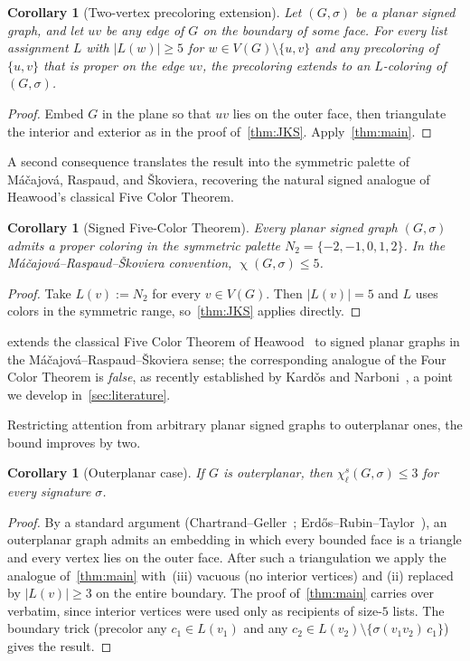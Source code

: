 \documentclass[11pt,a4paper]{article}
\theoremstyle{plain}
\newtheorem{corollary}[theorem]{Corollary}
\theoremstyle{definition}
\newcommand{\V}{V}
\DeclareMathOperator{\chia}{\chi}
\newcommand{\chs}{\chi_{\ell}^{s}}
\newcommand{\Gs}{(G,\sigma)}
\newcommand{\Ns}[1]{N_{#1}}
\begin{document}
\begin{corollary}[Two-vertex precoloring extension]\label{cor:2vert}
Let $\Gs$ be a planar signed graph, and let $uv$ be any edge of $G$
on the boundary of some face. For every list assignment $L$ with
$|L(w)|\ge 5$ for $w\in\V(G)\setminus\{u,v\}$ and any precoloring
of $\{u,v\}$ that is proper on the edge $uv$, the precoloring
extends to an $L$-coloring of $\Gs$.
\end{corollary}

\begin{proof}
Embed $G$ in the plane so that $uv$ lies on the outer face, then
triangulate the interior and exterior as in the proof
of~\cref{thm:JKS}. Apply~\cref{thm:main}.
\end{proof}

A second consequence translates the result into the symmetric
palette of M\'a\v{c}ajov\'a, Raspaud, and \v{S}koviera, recovering
the natural signed analogue of Heawood's classical Five Color
Theorem.

\begin{corollary}[Signed Five-Color Theorem]\label{cor:five-color}
Every planar signed graph $\Gs$ admits a proper coloring in the
symmetric palette $\Ns{2}=\{-2,-1,0,1,2\}$. In the
M\'a\v{c}ajov\'a--Raspaud--\v{S}koviera convention,
$\chia\Gs\le 5$.
\end{corollary}

\begin{proof}
Take $L(v):=\Ns{2}$ for every $v\in\V(G)$. Then $|L(v)|=5$ and
$L$ uses colors in the symmetric range, so~\cref{thm:JKS} applies
directly.
\end{proof}

 extends the classical Five Color Theorem
of Heawood~\cite{Heawood1890} to signed planar graphs in the
M\'a\v{c}ajov\'a--Raspaud--\v{S}koviera sense; the corresponding
analogue of the Four Color Theorem is \emph{false}, as recently
established by Kard\v{o}s and Narboni~\cite{KardosNarboni2021}, a
point we develop in~\cref{sec:literature}.

Restricting attention from arbitrary planar signed graphs to
outerplanar ones, the bound improves by two.

\begin{corollary}[Outerplanar case]\label{cor:outerplanar}
If $G$ is outerplanar, then $\chs\Gs\le 3$ for every signature
$\sigma$.
\end{corollary}

\begin{proof}
By a standard argument (Chartrand--Geller~\cite{ChartrandGeller1969};
Erd\H{o}s--Rubin--Taylor~\cite{ERT1979}), an outerplanar graph
admits an embedding in which every bounded face is a triangle and
every vertex lies on the outer face. After such a triangulation we
apply the analogue of~\cref{thm:main} with~(iii) vacuous (no
interior vertices) and (ii) replaced by $|L(v)|\ge 3$ on the
entire boundary. The proof of~\cref{thm:main} carries over verbatim,
since interior vertices were used only as recipients of size-$5$
lists. The boundary trick (precolor any $c_1\in L(v_1)$ and any
$c_2\in L(v_2)\setminus\{\sigma(v_1v_2)\,c_1\}$) gives the result.
\end{proof}
\end{document}
